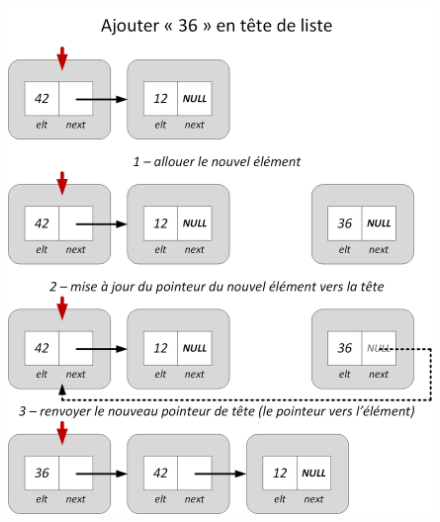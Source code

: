 \documentclass[11pt,a4paper]{article}
\begin{document}
\begin{figure}[ht!]
\centering
\centerline{   %
\includegraphics[scale=0.85]{img/listes/Listes_Pointeurs_3_3_ajout_tete.png}
}
\end{figure}

\vfillLast

\clearpage

\vfillFirst
\end{document}
